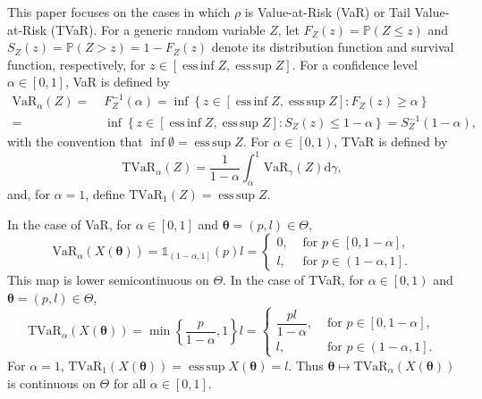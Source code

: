 \documentclass[a4paper,12pt]{article}
\DeclareMathOperator*{\esssup}{ess\,sup}
\DeclareMathOperator*{\essinf}{ess\,inf}
\begin{document}
This paper focuses on the cases in which $\rho$ is Value-at-Risk (VaR) or Tail Value-at-Risk (TVaR). For a generic random variable $Z$, let $F_Z\left(z\right)=\mathbb{P}\left(Z\leq z\right)$ and $S_Z\left(z\right)=\mathbb{P}\left(Z>z\right)=1-F_Z\left(z\right)$ denote its distribution function and survival function, respectively, for $z\in\left[\essinf Z,\esssup Z\right]$. For a confidence level $\alpha\in\left[0,1\right]$, VaR is defined by
\begin{align*}
\text{VaR}_{\alpha}\left(Z\right)=&\;
F_Z^{-1}\left(\alpha\right)=\inf\left\{z\in\left[\essinf Z,\esssup Z\right]:F_Z\left(z\right)\geq\alpha\right\}\\=&\;\inf\left\{z\in\left[\essinf Z,\esssup Z\right]:S_Z\left(z\right)\leq 1-\alpha\right\}=S_Z^{-1}\left(1-\alpha\right),
\end{align*}
with the convention that $\inf\emptyset=\esssup Z$. For $\alpha\in\left[0,1\right)$, TVaR is defined by
\begin{equation*}
\text{TVaR}_{\alpha}\left(Z\right)=\frac{1}{1-\alpha}\int_{\alpha}^{1}\text{VaR}_{\gamma}\left(Z\right)\text{d}\gamma,
\end{equation*}
and, for $\alpha=1$, define $\text{TVaR}_{1}\left(Z\right)=\esssup Z$.

In the case of VaR, for $\alpha\in\left[0,1\right]$ and ${\bm\theta}=\left(p,l\right)\in\Theta$,
\begin{equation*}
\text{VaR}_{\alpha}\left(X\left({\bm\theta}\right)\right)=\mathds{1}_{\left(1-\alpha,1\right]}\left(p\right)l=\begin{cases}
0,&\text{ for }p\in\left[0,1-\alpha\right],\\
l,&\text{ for }p\in\left(1-\alpha,1\right].
\end{cases}
\end{equation*}
This map is lower semicontinuous on $\Theta$. In the case of TVaR, for $\alpha\in\left[0,1\right)$ and ${\bm\theta}=\left(p,l\right)\in\Theta$,
\begin{equation*}
\text{TVaR}_{\alpha}\left(X\left({\bm\theta}\right)\right)=\min\left\{\frac{p}{1-\alpha},1\right\}l=
\begin{cases}
\dfrac{pl}{1-\alpha},&\text{ for }p\in\left[0,1-\alpha\right],\\
l,&\text{ for }p\in\left(1-\alpha,1\right].
\end{cases}
\end{equation*}
For $\alpha=1$, $\text{TVaR}_{1}\left(X\left({\bm\theta}\right)\right)=\esssup X\left({\bm\theta}\right)=l$. Thus ${\bm\theta}\mapsto\text{TVaR}_{\alpha}\left(X\left({\bm\theta}\right)\right)$ is continuous on $\Theta$ for all $\alpha\in\left[0,1\right]$.
\end{document}
